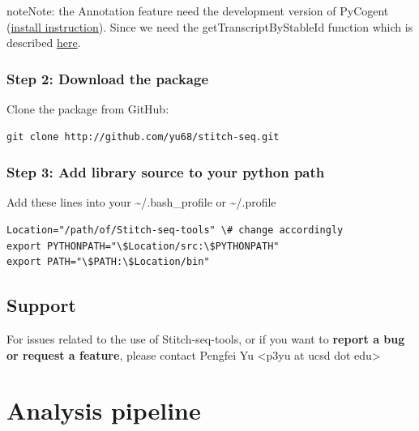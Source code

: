 \documentclass[letterpaper,10pt,english]{sphinxmanual}
\begin{document}
\begin{notice}{note}{Note:}
the Annotation feature need the development version of PyCogent (\href{http://pycogent.org/install.html\#to-use-the-development-version-of-pycogent}{install instruction}). Since we need the getTranscriptByStableId function which is described \href{https://github.com/pycogent/pycogent/issues/21}{here}.
\end{notice}


\subsection{Step 2: Download the package}
\label{Stitch-seq-tools:step-2-download-the-package}
Clone the package from GitHub:

\begin{Verbatim}[commandchars=\\\{\}]
git clone http://github.com/yu68/stitch-seq.git
\end{Verbatim}


\subsection{Step 3: Add library source to your python path}
\label{Stitch-seq-tools:step-3-add-library-source-to-your-python-path}
Add these lines into your \textasciitilde{}/.bash\_profile or \textasciitilde{}/.profile

\begin{Verbatim}[commandchars=\\\{\}]
Location="/path/of/Stitch-seq-tools" \# change accordingly
export PYTHONPATH="\$Location/src:\$PYTHONPATH"
export PATH="\$PATH:\$Location/bin"
\end{Verbatim}


\section{Support}
\label{Stitch-seq-tools:support}
For issues related to the use of Stitch-seq-tools, or if you want to \textbf{report a bug or request a feature}, please contact Pengfei Yu \textless{}p3yu at ucsd dot edu\textgreater{}


\chapter{Analysis pipeline}
\label{Analysis_pipeline:analysis-pipeline}\label{Analysis_pipeline::doc}
\end{document}
